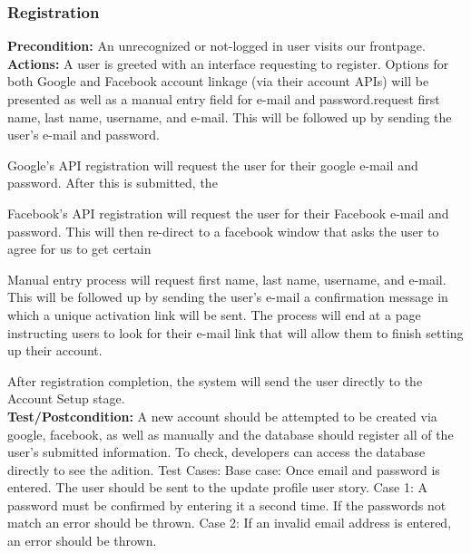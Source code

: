 \documentclass[a4paper,12pt]{article}
\begin{document}
\subsubsection{Registration}
\textbf{Precondition:} An unrecognized or not-logged in user visits our frontpage.\\
\textbf{Actions:} A user is greeted with an interface requesting to register. Options for both Google and Facebook account linkage (via their account APIs) will be presented as well as a manual entry field for e-mail and password.request first name, last name, username, and e-mail. This will be followed up by sending the user's e-mail and password. \begin{list}{•}{•}
\item Google's API registration will request the user for their google e-mail and password.  After this is submitted, the
\item Facebook's API registration will request the user for their Facebook e-mail and password.  This will then re-direct to a facebook window that asks the user to agree for us to get certain 
\item Manual entry process will request first name, last name, username, and e-mail.  This will be followed up by sending the user's e-mail a confirmation message in which a unique activation link will be sent.  The process will end at a page instructing users to look for their e-mail link that will allow them to finish setting up their account.
\end{list}
After registration completion, the system will send the user directly to the Account Setup stage.\\
\textbf{Test/Postcondition:} A new account should be attempted to be created via google, facebook, as well as manually and the database should register all of the user's submitted information.  To check, developers can access the database directly to see the adition.
Test Cases:
Base case:
Once email and password is entered. The user should be sent to the update profile user story.
Case 1:
A password must be confirmed by entering it a second time. If the passwords not match an error should be thrown.
Case 2:
If an invalid email address is entered, an error should be thrown.
\end{document}
